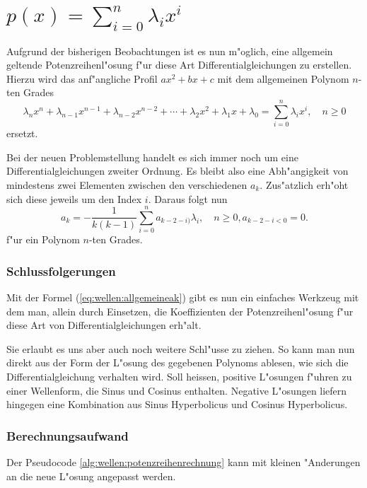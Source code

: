 \section{\texorpdfstring{$p(x) = \sum_{i=0}^{n}\lambda_ix^i$}{p(x) = summe i = 
0 bis n lambdai xi}}

Aufgrund der bisherigen Beobachtungen ist es nun m"oglich, eine 
allgemein geltende Potenzreihenl"osung f"ur diese Art Differentialgleichungen 
zu erstellen. Hierzu wird das anf"angliche Profil $ax^2 + bx + c$ mit dem 
allgemeinen Polynom $n$-ten Grades
\begin{equation*}
	\lambda_nx^n + \lambda_{n-1}x^{n-1} + \lambda_{n-2}x^{n-2} + \dotsb + 
	\lambda_2x^2 + \lambda_1x + \lambda_0 = \sum_{i=0}^{n}\lambda_ix^i, \quad n 
	\ge 0
\end{equation*}
ersetzt.

Bei der neuen Problemstellung handelt es sich immer noch um eine 
Differentialgleichungen zweiter Ordnung. Es bleibt also eine Abh"angigkeit von 
mindestens zwei Elementen zwischen den verschiedenen $a_k$. Zus"atzlich erh"oht 
sich diese jeweils um den Index $i$. Daraus folgt nun
\begin{equation}
	a_k = -\frac{1}{k(k-1)}\sum_{i=0}^{n}a_{k-2-i)}\lambda_i, \quad n \ge 0, 
	a_{k-2-i < 0} =  0.
	\label{eq:wellen:allgemeineak}
\end{equation}
f"ur ein Polynom $n$-ten Grades.

\subsubsection{Schlussfolgerungen}

Mit der Formel (\ref{eq:wellen:allgemeineak}) gibt es nun ein einfaches 
Werkzeug mit dem man, allein durch Einsetzen, die Koeffizienten der 
Potenzreihenl"osung f"ur diese Art von Differentialgleichungen erh"alt.

Sie erlaubt es uns aber auch noch weitere Schl"usse zu ziehen. So kann man 
nun direkt aus der Form der L"osung des gegebenen Polynoms ablesen, wie sich 
die Differentialgleichung verhalten wird. Soll heissen, positive L"osungen 
f"uhren zu einer Wellenform, die Sinus und Cosinus enthalten. Negative 
L"osungen liefern hingegen eine Kombination aus Sinus Hyperbolicus und Cosinus 
Hyperbolicus.

\subsubsection{Berechnungsaufwand}
Der Pseudocode \ref{alg:wellen:potenzreihenrechnung} kann mit kleinen 
"Anderungen an die neue L"osung angepasst werden. 







